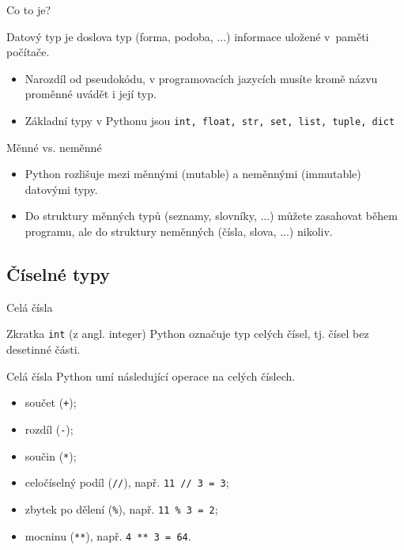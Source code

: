 \documentclass[aspectratio=169,11pt]{beamer}
\begin{document}
\begin{frame}[plain]
 \sectionpage
\end{frame}

\begin{frame}{Co to je?}
 \begin{tcolorbox}[title=Datový typ]
  \alert{Datový typ} je doslova typ (forma, podoba, ...) informace uložené
  v~paměti počítače.
 \end{tcolorbox}
 \pause
 \begin{itemize}
  \item<2-> Narozdíl od pseudokódu, v programovacích jazycích musíte kromě názvu
   proměnné uvádět i její typ.
  \item<3-> Základní typy v Pythonu jsou \texttt{int, float, str, set, list,
   tuple, dict}
 \end{itemize}
\end{frame}

\begin{frame}{Měnné vs. neměnné}
 \begin{itemize}
  \item<1-> Python rozlišuje mezi \alert{měnnými} (mutable) a \alert{neměnnými}
   (immutable) datovými typy.
  \item<2-> Do struktury měnných typů (seznamy, slovníky, ...) můžete zasahovat
   během programu, ale do struktury neměnných (čísla, slova, ...) nikoliv.
 \end{itemize}
\end{frame}

\subsection[Číselné typy]{Číselné typy}

\begin{frame}{Celá čísla}
 \begin{tcolorbox}[title=Datový typ \texttt{int}]
  Zkratka \alert{\texttt{int}} (z angl. \alert{int}eger) Python označuje typ
  celých čísel, tj. čísel bez desetinné části.
 \end{tcolorbox}
\end{frame}

\begin{frame}{Celá čísla}
 Python umí následující operace na celých číslech.
 \begin{itemize}
  \item součet (\texttt{+});
  \item rozdíl (\texttt{-});
  \item součin (\texttt{*});
  \pause
  \item<2-> celočíselný podíl (\texttt{//}), např. \texttt{11 // 3 = 3};
  \item<3-> zbytek po dělení (\texttt{\%}), např. \texttt{11 \% 3 = 2};
  \item<4-> mocninu (\texttt{**}), např. \texttt{4 ** 3 = 64}.
 \end{itemize}
\end{frame}
\end{document}
